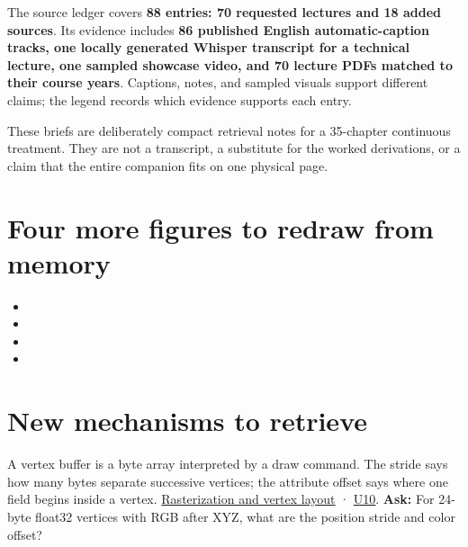 The source ledger covers \textbf{88 entries: 70 requested lectures and 18 added sources}. Its evidence includes \textbf{86 published English automatic-caption tracks, one locally generated Whisper transcript for a technical lecture, one sampled showcase video, and 70 lecture PDFs matched to their course years}. Captions, notes, and sampled visuals support different claims; the legend records which evidence supports each entry.

These briefs are deliberately compact retrieval notes for a 35-chapter continuous treatment. They are not a transcript, a substitute for the worked derivations, or a claim that the entire companion fits on one physical page.

\section{Four more figures to redraw from memory}\label{appendix-a8f634b076b5-four-more-figures-to-redraw-from-memory}

\begin{itemize}
\tightlist
\item
\item
\item
\item
\end{itemize}

\section{New mechanisms to retrieve}\label{appendix-a8f634b076b5-new-mechanisms-to-retrieve}

A vertex buffer is a byte array interpreted by a draw command. The stride says how many bytes separate successive vertices; the attribute offset says where one field begins inside a vertex. \href{Continuous\%20Notes/University\%20-\%20Worlds,\%20Images\%20and\%20Inference\%20-\%20Graphics,\%20Vision\%20and\%20Photography\#Rasterization,\%20coverage,\%20and\%20depth}{Rasterization and vertex layout} · \href{Continuous\%20Notes/University\%20-\%20Worlds,\%20Images\%20and\%20Inference\%20-\%20Graphics,\%20Vision\%20and\%20Photography\#Figure\%20U10\%20-\%20Vertex\%20fetch\%20uses\%20a\%20stride\%20and\%20byte\%20offset}{U10}. \textbf{Ask:} For 24-byte float32 vertices with RGB after XYZ, what are the position stride and color offset?

